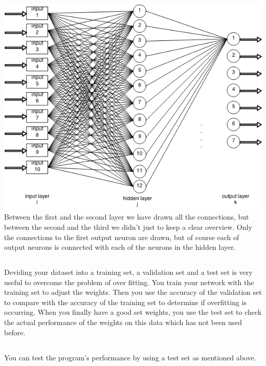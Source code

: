 \documentclass{scrartcl}
\begin{document}
  \subsection{}
  \includegraphics[scale = 0.5]{network.png}
  \\ Between the first and the second layer we have drawn all the connections, but between the second and the third we didn't just to keep a clear overview. Only the connections to the first output neuron are drawn, but of course each of output neurons is connected with each of the neurons in the hidden layer.
  
  \subsection{}
  Deviding your dataset into a training set, a validation set and a test set is very useful to overcome the problem of over fitting. You train your network with the training set to adjust the weights. Then you use the accuracy of the validation set to compare with the accuracy of the training set to determine if overfitting is occurring. When you finally have a good set weights, you use the test set to check the actual performance of the weights on this data which has not been used before.
  
  \subsection{}
  You can test the program's performance by using a test set as mentioned above. 
  
\end{document}
